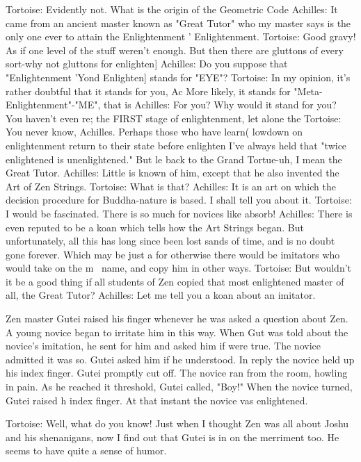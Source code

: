 Tortoise: Evidently not. What is the origin of the Geometric Code Achilles: It came from
   an ancient master known as "Great Tutor" who my master says is the only one ever to
   attain the Enlightenment ' Enlightenment.
Tortoise: Good gravy! As if one level of the stuff weren't enough. But then there are
   gluttons of every sort-why not gluttons for enlighten] Achilles: Do you suppose that
   "Enlightenment 'Yond Enlighten] stands for "EYE"?
Tortoise: In my opinion, it's rather doubtful that it stands for you, Ac More likely, it
   stands for "Meta-Enlightenment"-"ME", that is
Achilles: For you? Why would it stand for you? You haven't even re; the FIRST stage of
   enlightenment, let alone the
Tortoise: You never know, Achilles. Perhaps those who have learn( lowdown on
   enlightenment return to their state before enlighten I've always held that "twice
   enlightened is unenlightened." But le back to the Grand Tortue-uh, I mean the Great
   Tutor.
Achilles: Little is known of him, except that he also invented the Art of Zen Strings.
Tortoise: What is that?
Achilles: It is an art on which the decision procedure for Buddha-nature is based. I shall
   tell you about it.
Tortoise: I would be fascinated. There is so much for novices like absorb!
Achilles: There is even reputed to be a koan which tells how the Art Strings began. But
   unfortunately, all this has long since been lost sands of time, and is no doubt gone
   forever. Which may be just a for otherwise there would be imitators who would take
   on the m~ name, and copy him in other ways.
Tortoise: But wouldn't it be a good thing if all students of Zen copied that most
   enlightened master of all, the Great Tutor?
Achilles: Let me tell you a koan about an imitator.

   Zen master Gutei raised his finger whenever he was asked a question about Zen. A
   young novice began to irritate him in this way. When Gut was told about the
   novice's imitation, he sent for him and asked him if were true. The novice
   admitted it was so. Gutei asked him if he understood. In reply the novice held up
   his index finger. Gutei promptly cut off. The novice ran from the room, howling in
   pain. As he reached it threshold, Gutei called, "Boy!" When the novice turned,
   Gutei raised h index finger. At that instant the novice vas enlightened.

Tortoise: Well, what do you know! Just when I thought Zen was all about Joshu and his
   shenanigans, now I find out that Gutei is in on the merriment too. He seems to have
   quite a sense of humor.

